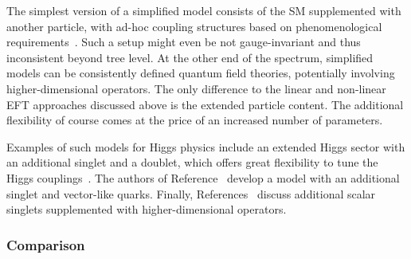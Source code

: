 The simplest version of a simplified model consists of the SM
supplemented with another particle, with ad-hoc coupling structures
based on phenomenological requirements~\cite{Biekotter:2016ecg}. Such
a setup might even be not gauge-invariant and thus inconsistent beyond
tree level. At the other end of the spectrum, simplified models can be
consistently defined quantum field theories, potentially involving
higher-dimensional operators. The only difference to the linear and
non-linear EFT approaches discussed above is the extended particle
content. The additional flexibility of course comes at the price of an
increased number of parameters.

Examples of such models for Higgs physics include an extended Higgs
sector with an additional singlet and a doublet, which offers great
flexibility to tune the Higgs couplings~\cite{Lopez-Val:2013yba}. The
authors of Reference~\cite{Dolan:2016eki} develop a model with an
additional singlet and vector-like quarks. Finally,
References~\cite{Gripaios:2016xuo, Bauer:2016hcu} discuss additional
scalar singlets supplemented with higher-dimensional operators.



\subsubsection{Comparison}

